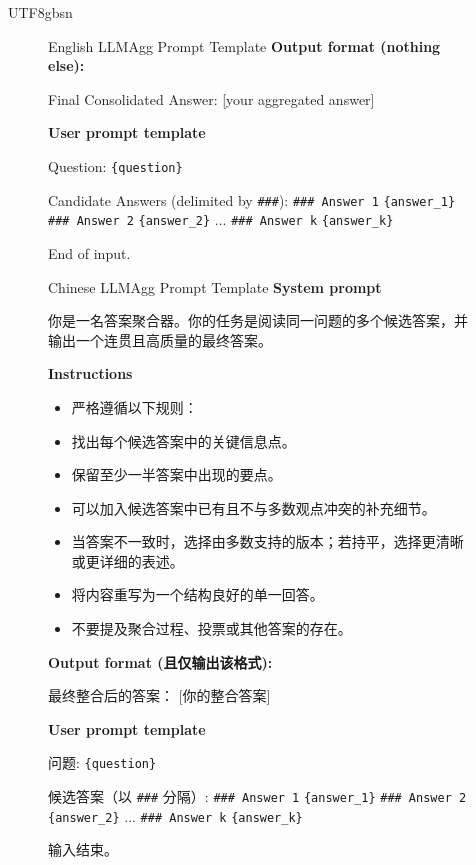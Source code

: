 \documentclass[11pt]{article}
\begin{document}
\begin{CJK*}{UTF8}{gbsn}
\begin{figure}[htbp!]
\begin{minipage}{0.98\textwidth}
\begin{PromptBox}{English LLMAgg Prompt Template}
\smallskip
\textbf{Output format (nothing else):}

Final Consolidated Answer:
[your aggregated answer]

\smallskip
\textbf{User prompt template}

Question:
\verb|{question}|

Candidate Answers (delimited by \verb|###|):
\verb|### Answer 1|
\verb|{answer_1}|
\verb|### Answer 2|
\verb|{answer_2}|
...
\verb|### Answer k|
\verb|{answer_k}|

End of input.
\end{PromptBox}
\end{minipage}
\end{figure}

\begin{figure}[htbp!]
\centering
\begin{minipage}{0.98\textwidth}
\begin{PromptBox}{Chinese LLMAgg Prompt Template}
\textbf{System prompt}

你是一名答案聚合器。你的任务是阅读同一问题的多个候选答案，并输出一个连贯且高质量的最终答案。

\smallskip
\textbf{Instructions}
\begin{itemize}
  \item 严格遵循以下规则：
  \item 找出每个候选答案中的关键信息点。
  \item 保留至少一半答案中出现的要点。
  \item 可以加入候选答案中已有且不与多数观点冲突的补充细节。
  \item 当答案不一致时，选择由多数支持的版本；若持平，选择更清晰或更详细的表述。
  \item 将内容重写为一个结构良好的单一回答。
  \item 不要提及聚合过程、投票或其他答案的存在。
\end{itemize}

\smallskip
\textbf{Output format (且仅输出该格式):}

最终整合后的答案：
[你的整合答案]

\smallskip
\textbf{User prompt template}

问题:
\verb|{question}|

候选答案（以 \verb|###| 分隔）:
\verb|### Answer 1|
\verb|{answer_1}|
\verb|### Answer 2|
\verb|{answer_2}|
...
\verb|### Answer k|
\verb|{answer_k}|

输入结束。
\end{PromptBox}
\end{minipage}
\end{figure}



\end{CJK*}
\end{document}
